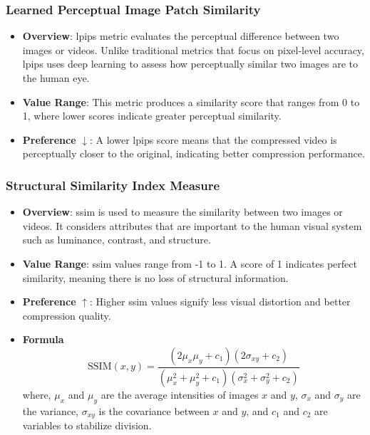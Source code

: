        \subsubsection{Learned Perceptual Image Patch Similarity}
            \begin{itemize}
                \item \textbf{Overview}: \gls{lpips} metric evaluates the perceptual difference between two images or videos. Unlike traditional metrics that focus on pixel-level accuracy, \gls{lpips} uses deep learning to assess how perceptually similar two images are to the human eye.
                \item \textbf{Value Range}: This metric produces a similarity score that ranges from 0 to 1, where lower scores indicate greater perceptual similarity.
                \item \textbf{Preference} $\downarrow$: A lower \gls{lpips} score means that the compressed video is perceptually closer to the original, indicating better compression performance.
            \end{itemize}

        \subsubsection{Structural Similarity Index Measure}
            \begin{itemize}
                \item \textbf{Overview}: \gls{ssim} is used to measure the similarity between two images or videos. It considers attributes that are important to the human visual system such as luminance, contrast, and structure.
                \item \textbf{Value Range}: \gls{ssim} values range from -1 to 1. A score of 1 indicates perfect similarity, meaning there is no loss of structural information.
                \item \textbf{Preference} $\uparrow$: Higher \gls{ssim} values signify less visual distortion and better compression quality.
                \item \textbf{Formula}
                \begin{equation}\label{eqn:SSIM}
                    \text{SSIM}(x, y) = \frac{(2 \mu_x \mu_y + c_1)(2 \sigma_{xy} + c_2)}{(\mu_x^2 + \mu_y^2 + c_1)(\sigma_x^2 + \sigma_y^2 + c_2)}
                \end{equation}
                where, $\mu_x$ and $\mu_y$ are the average intensities of images $x$ and $y$, $\sigma_{x}$ and $\sigma_y$ are the variance, $\sigma_{xy}$ is the covariance between $x$ and $y$, and $c_1$ and $c_2$ are variables to stabilize division.
            \end{itemize}

